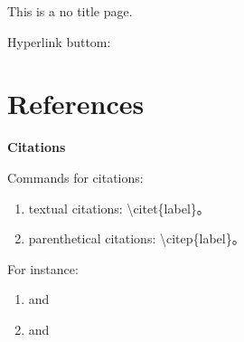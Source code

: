 \documentclass[12pt, aspectratio=169]{beamer}
\begin{document}

\begin{frame}

	This is a no title page.\\
	
	\bigskip
		
	Hyperlink buttom: \hyperlink{Link Text}{}
	
\end{frame}


\section{References}


\linespread{1}  
\begin{frame}{\textbf{Citations}}
\linespread{1.5} 

	Commands for citations:
	
	\begin{enumerate}[1]
		\item textual citations: \textbackslash citet\{label\}。
		\item parenthetical citations: \textbackslash citep\{label\}。
	\end{enumerate}
	
	\bigskip
	
	For instance:
	
	\begin{enumerate}[1]
		\item \citet{Non-CES} and \citet{Melitz (2003)}
		\item \citep{Non-CES} and \citep{Melitz (2003)}
	\end{enumerate}
	
\end{frame}

\end{document}
